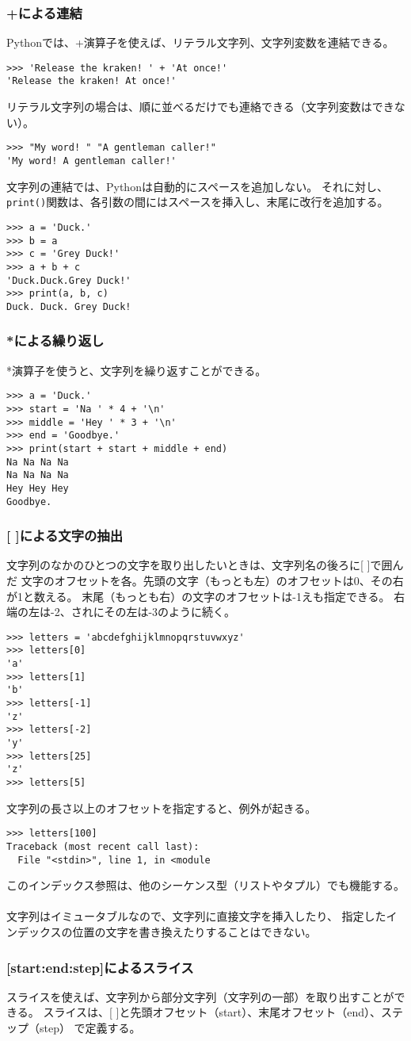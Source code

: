 \documentclass[11pt, oneside]{article}   	%
\begin{document}
\subsubsection{+による連結}
Pythonでは、+演算子を使えば、リテラル文字列、文字列変数を連結できる。
\begin{lstlisting}
>>> 'Release the kraken! ' + 'At once!'
'Release the kraken! At once!'
\end{lstlisting}
リテラル文字列の場合は、順に並べるだけでも連絡できる（文字列変数はできない）。
\begin{lstlisting}
>>> "My word! " "A gentleman caller!"
'My word! A gentleman caller!'
\end{lstlisting}
文字列の連結では、Pythonは自動的にスペースを追加しない。
それに対し、\verb|print()|関数は、各引数の間にはスペースを挿入し、末尾に改行を追加する。
\begin{lstlisting}
>>> a = 'Duck.'
>>> b = a
>>> c = 'Grey Duck!'
>>> a + b + c
'Duck.Duck.Grey Duck!'
>>> print(a, b, c)
Duck. Duck. Grey Duck!
\end{lstlisting}

\subsubsection{*による繰り返し}
*演算子を使うと、文字列を繰り返すことができる。
\begin{lstlisting}
>>> a = 'Duck.'
>>> start = 'Na ' * 4 + '\n'
>>> middle = 'Hey ' * 3 + '\n'
>>> end = 'Goodbye.'
>>> print(start + start + middle + end)
Na Na Na Na 
Na Na Na Na 
Hey Hey Hey 
Goodbye.
\end{lstlisting}

\subsubsection{[ ]による文字の抽出}
文字列のなかのひとつの文字を取り出したいときは、文字列名の後ろに[ ]で囲んだ
文字のオフセットを各。先頭の文字（もっとも左）のオフセットは0、その右が1と数える。
末尾（もっとも右）の文字のオフセットは-1えも指定できる。
右端の左は-2、されにその左は-3のように続く。
\begin{lstlisting}
>>> letters = 'abcdefghijklmnopqrstuvwxyz'
>>> letters[0]
'a'
>>> letters[1]
'b'
>>> letters[-1]
'z'
>>> letters[-2]
'y'
>>> letters[25]
'z'
>>> letters[5]
\end{lstlisting}
文字列の長さ以上のオフセットを指定すると、例外が起きる。
\begin{lstlisting}
>>> letters[100]
Traceback (most recent call last):
  File "<stdin>", line 1, in <module
\end{lstlisting}
このインデックス参照は、他のシーケンス型（リストやタプル）でも機能する。\\
 \\
 文字列はイミュータブルなので、文字列に直接文字を挿入したり、
 指定したインデックスの位置の文字を書き換えたりすることはできない。
 
\subsubsection{[start:end:step]によるスライス}
スライスを使えば、文字列から部分文字列（文字列の一部）を取り出すことができる。
スライスは、[ ]と先頭オフセット（start）、末尾オフセット（end）、ステップ（step）
で定義する。
\end{document}

